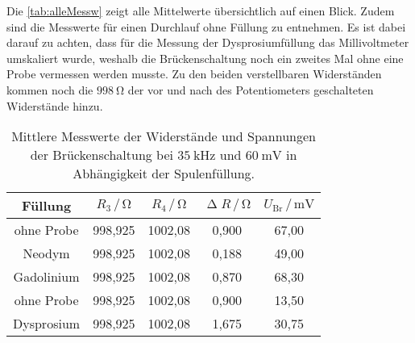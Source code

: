 Die \autoref{tab:alleMessw} zeigt alle Mittelwerte übersichtlich auf einen Blick. Zudem sind die Messwerte für einen Durchlauf ohne Füllung zu entnehmen.
Es ist dabei darauf zu achten, dass für die Messung der Dysprosiumfüllung das Millivoltmeter umskaliert wurde, weshalb die Brückenschaltung noch ein zweites Mal ohne eine Probe vermessen werden musste.
Zu den beiden verstellbaren Widerständen kommen noch die $\SI{998}{\ohm}$ der vor und nach des Potentiometers geschalteten Widerstände hinzu.
\begin{table}[H]
  \centering
  \caption{Mittlere Messwerte der Widerstände und Spannungen der Brückenschaltung bei $\SI{35}{\kilo\hertz}$ und $\SI{60}{\milli\volt}$ in Abhängigkeit der Spulenfüllung.}
  \label{tab:alleMessw}
  \begin{tabular}{c| c c c c}
    \toprule
    Füllung & $R_3 \,/\, \si{\ohm}$ & $R_4 \,/\, \si{\ohm}$ & $\upDelta R \,/\, \si{\ohm}$ & $U_{\text{Br}} \,/\, \si{\milli\volt}$ \\
    \midrule
    ohne Probe & 998,925 & 1002,08 & 0,900 & 67,00 \\
    Neodym & 998,925 & 1002,08 & 0,188 & 49,00\\ 
    Gadolinium & 998,925 & 1002,08 & 0,870 & 68,30\\ \hline
    ohne Probe & 998,925 & 1002,08 & 0,900 & 13,50 \\
    Dysprosium & 998,925 & 1002,08 & 1,675 & 30,75 \\
    \bottomrule
  \end{tabular}
\end{table}